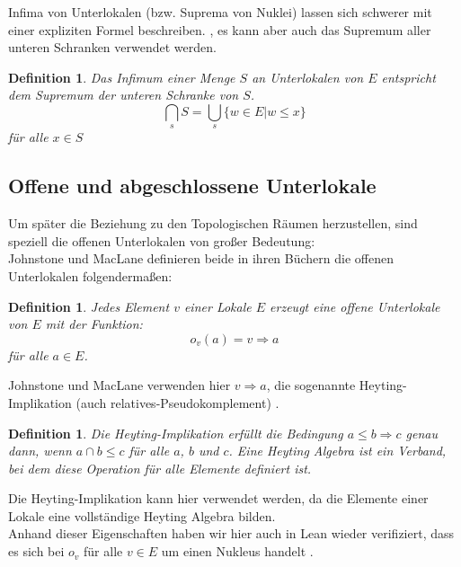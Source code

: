 \documentclass{article}
\newtheorem{definition}[satz]{Definition}
\begin{document}
Infima von Unterlokalen (bzw. Suprema von Nuklei) lassen sich schwerer mit einer expliziten Formel beschreiben.  %
, es kann aber auch das Supremum aller unteren Schranken verwendet werden.\\
\begin{definition}
    Das Infimum einer Menge $S$ an Unterlokalen von $E$ entspricht dem Supremum der unteren Schranke von $S$.
    $$\bigcap_s S = \bigcup_s \{w \in E | w \le x\}$$ für alle $x \in S$
\end{definition}

\subsection{Offene und abgeschlossene Unterlokale}
Um später die Beziehung zu den Topologischen Räumen herzustellen, sind speziell die offenen Unterlokalen von großer Bedeutung:\\
Johnstone und MacLane definieren beide in ihren Büchern die offenen Unterlokalen folgendermaßen:
\begin{definition}
\label{def:open}
    Jedes Element $v$ einer Lokale $E$ erzeugt eine offene Unterlokale von $E$ mit der Funktion:
    $$o_v(a) = v \Rightarrow a$$ für alle $a \in E$. %
\end{definition}
Johnstone und MacLane verwenden hier $v \Rightarrow a$, die sogenannte Heyting-Implikation (auch relatives-Pseudokomplement) \autocite{noauthor_heyting-algebra_2024}\autocite{noauthor_heyting_nodate}.
\begin{definition}
    Die Heyting-Implikation erfüllt die Bedingung $a \le b \Rightarrow c$ genau dann, wenn $a \cap b \le c$ für alle $a$, $b$ und $c$. Eine Heyting Algebra ist ein Verband, bei dem diese Operation für alle Elemente definiert ist.
\end{definition}
Die Heyting-Implikation kann hier verwendet werden, da die Elemente einer Lokale eine vollständige Heyting Algebra bilden.\\
Anhand dieser Eigenschaften haben wir hier auch in Lean wieder verifiziert, dass es sich bei $o_v$ für alle $v \in E$ um einen Nukleus handelt \autocite{noauthor_leroyopen_sublocales_nodate}. %
\end{document}
